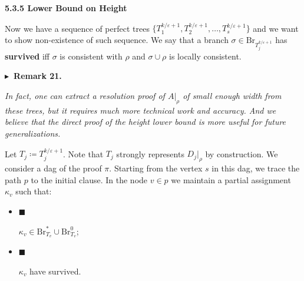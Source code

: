 \documentclass[10pt,a4paper]{article}
\begin{document}
\par\medskip\noindent\textbf{
5.3.5 Lower Bound on Height}\par




Now we have a sequence of perfect trees $\{T^{k/\varepsilon+1}_{1},T^{k/\varepsilon+1}_{2},\dots,T^{k/\varepsilon+1}_{s}\}$ and we want to show non-existence of such sequence. We say that a
branch $\sigma\in\mathrm{Br}_{T^{k/\varepsilon+1}_{j}}$ has \textbf{survived} iff $\sigma$ is consistent with
$\rho$ and $\sigma\cup\rho$ is locally consistent.\par





\par\medskip\noindent\textbf{
$\blacktriangleright$ Remark 21.
}\par



\emph{In fact, one can extract a resolution proof of $A|_{\rho}$ of small enough width from these
trees, but it requires much more technical work and accuracy. And we believe that the direct proof
of the height lower bound is more useful for future generalizations.}\par






Let $T_{j}\coloneqq T^{k/\varepsilon+1}_{j}$. Note that $T_{j}$ strongly represents $D_{j}|_{\rho}$ by
construction. We consider a dag of the proof $\pi$. Starting from the vertex $s$ in this dag, we trace
the path $p$ to the initial clause. In the node $v\in p$ we maintain a partial assignment $\kappa_{v}$
such that:\par


\begin{itemize}


\item[] 
$\blacksquare$ 


$\kappa_{v}\in\mathrm{Br}^{*}_{T_{v}}\cup\mathrm{Br}^{0}_{T_{v}}$;\par





\item[] 
$\blacksquare$ 


$\kappa_{v}$ have survived.\par





\end{itemize}
\end{document}
